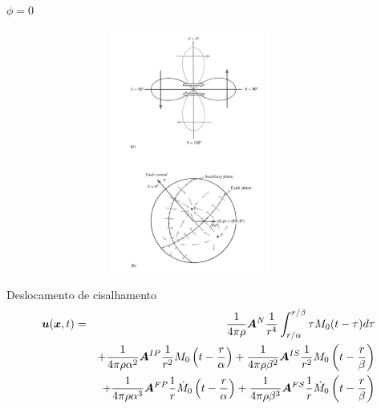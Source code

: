\documentclass{beamer}
\newcommand{\ub}{\bar{u}}
\newcommand{\g}{\gamma}
\begin{document}
\begin{frame}{$\phi = 0$}
	\begin{figure}[htb]
		\centering
		\includegraphics[width= 10cm, height= 8cm]{fig46}
	\end{figure}
\end{frame}



\begin{frame}{Deslocamento de cisalhamento}
	\begin{eqnarray}
	\boldsymbol{u}(\boldsymbol{x},t)&=&\frac{1}{4\pi\rho}\boldsymbol{A}^N\frac{1}{r^4}\int_{r/\alpha}^{r/\beta} \tau M_0(t-\tau) d\tau \nonumber \\
	&&+ \frac{1}{4\pi\rho\alpha^2}\boldsymbol{A}^{IP}\frac{1}{r^2}M_0\left(t-\frac{r}{\alpha}\right) + \frac{1}{4\pi\rho\beta^2}\boldsymbol{A}^{IS}\frac{1}{r^2}M_0\left(t-\frac{r}{\beta}\right) \nonumber \\
	&&+ \frac{1}{4\pi\rho\alpha^3}\boldsymbol{A}^{FP}\frac{1}{r}\dot{M}_0\left(t-\frac{r}{\alpha}\right) + \frac{1}{4\pi\rho\beta^3}\boldsymbol{A}^{FS}\frac{1}{r}\dot{M}_0\left(t-\frac{r}{\beta}\right) \nonumber 
	\end{eqnarray}
	
\end{frame}
\end{document}
